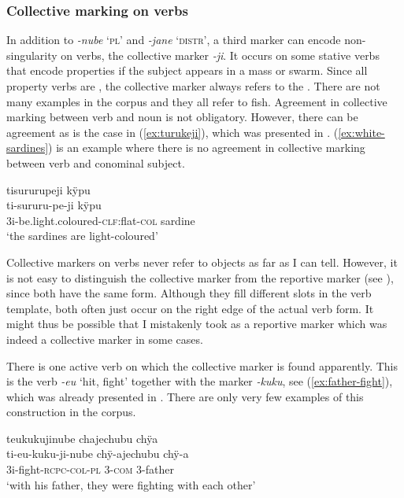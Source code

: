 \subsubsection{Collective marking on verbs}\label{CollectiveVerbs}

In addition to \textit{-nube} ‘\textsc{pl}’ and \textit{-jane} ‘\textsc{distr}’, a third marker can encode non-singularity on verbs, the collective marker \textit{-ji}. It occurs on some stative verbs  that encode properties if the subject appears in a mass or swarm. Since all property verbs are , the collective marker always refers to the . There are not many examples in the corpus and they all refer to fish. Agreement in collective marking between verb and noun is not obligatory. However, there can be agreement as is the case in (\ref{ex:turukeji}), which was presented in . (\ref{ex:white-sardines}) is an example where there is no agreement in collective marking between verb and conominal subject.

\ea\label{ex:white-sardines}
\begingl 
\glpreamble tisururupeji kÿpu\\
\gla ti-sururu-pe-ji kÿpu\\ 
\glb 3i-be.light.coloured-\textsc{clf}:flat-\textsc{col} sardine\\ 
\glft ‘the sardines are light-coloured’\\ 
\endgl
\trailingcitation{[jxx-e150925l-1.162]}
\xe

Collective markers on verbs never refer to objects as far as I can tell. However, it is not easy to distinguish the collective marker from the reportive marker (see ), since both have the same form. Although they fill different slots in the verb template, both often just occur on the right edge of the actual verb form. It might thus be possible that I mistakenly took as a reportive marker which was indeed a collective marker in some cases.

There is one active verb on which the collective marker is found apparently. This is the verb \textit{-eu} ‘hit, fight’ together with the  marker \textit{-kuku}, see (\ref{ex:father-fight}), which was already presented in . There are only very few examples of this construction in the corpus.

\ea\label{ex:father-fight}
\begingl
\glpreamble teukukujinube chajechubu chÿa\\
\gla ti-eu-kuku-ji-nube chÿ-ajechubu chÿ-a\\
\glb 3i-fight-\textsc{rcpc}-\textsc{col}-\textsc{pl} 3-\textsc{com} 3-father\\
\glft ‘with his father, they were fighting with each other’
\endgl
\trailingcitation{[rxx-e141230s.195]}
\xe
{}

